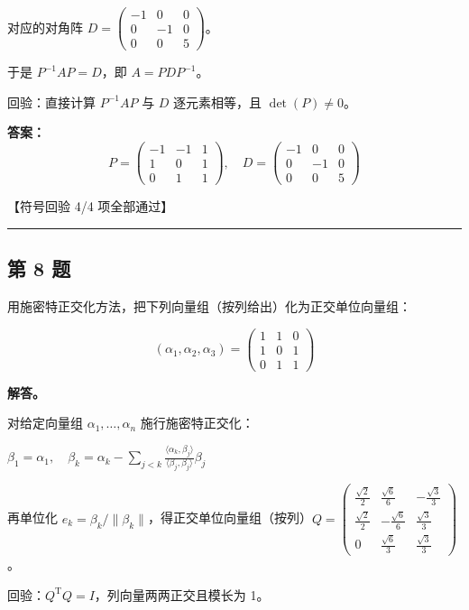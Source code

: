 \documentclass[12pt, a4paper]{article}
\newcommand{\problem}[1]{\subsection*{第 #1 题}}
\newcommand{\solution}{\textbf{解答。}}
\begin{document}
对应的对角阵 $D = \begin{pmatrix} -1 & 0 & 0 \\ 0 & -1 & 0 \\ 0 & 0 & 5 \end{pmatrix}$。

于是 $P^{-1}AP = D$，即 $A = PDP^{-1}$。

回验：直接计算 $P^{-1}AP$ 与 $D$ 逐元素相等，且 $\det(P)\neq 0$。

\textbf{答案：}
{\small
\[P = \begin{pmatrix} -1 & -1 & 1 \\ 1 & 0 & 1 \\ 0 & 1 & 1 \end{pmatrix},\quad D = \begin{pmatrix} -1 & 0 & 0 \\ 0 & -1 & 0 \\ 0 & 0 & 5 \end{pmatrix}\]
}

\textcolor{okgreen}{【符号回验 4/4 项全部通过】}

\vspace{0.8em}
\hrule
\vspace{0.8em}

\problem{8}

用施密特正交化方法，把下列向量组（按列给出）化为正交单位向量组：

$$
(\alpha_1, \alpha_2, \alpha_3) = \begin{pmatrix} 1 & 1 & 0 \\ 1 & 0 & 1 \\ 0 & 1 & 1 \end{pmatrix}
$$

\solution

对给定向量组 $\alpha_1,\dots,\alpha_n$ 施行施密特正交化：

$\beta_1 = \alpha_1,\quad \beta_k = \alpha_k - \sum_{j<k}\frac{\langle\alpha_k,\beta_j\rangle}{\langle\beta_j,\beta_j\rangle}\beta_j$

再单位化 $e_k = \beta_k/\|\beta_k\|$，得正交单位向量组（按列）$Q = \begin{pmatrix} \frac{\sqrt{2}}{2} & \frac{\sqrt{6}}{6} & - \frac{\sqrt{3}}{3} \\ \frac{\sqrt{2}}{2} & - \frac{\sqrt{6}}{6} & \frac{\sqrt{3}}{3} \\ 0 & \frac{\sqrt{6}}{3} & \frac{\sqrt{3}}{3} \end{pmatrix}$。

回验：$Q^{\mathrm{T}}Q = I$，列向量两两正交且模长为 1。
\end{document}
